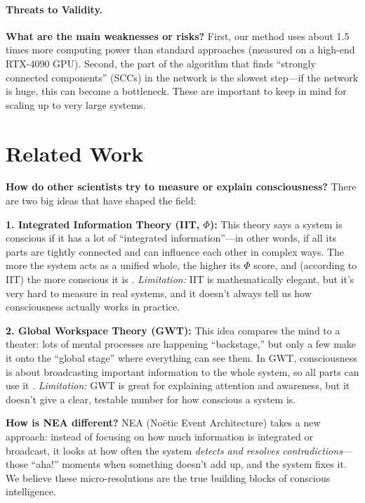\documentclass[11pt]{article}
\begin{document}
\paragraph{Threats to Validity.}
\textbf{What are the main weaknesses or risks?}  
First, our method uses about 1.5 times more computing power than standard approaches (measured on a high-end RTX-4090 GPU). Second, the part of the algorithm that finds “strongly connected components” (SCCs) in the network is the slowest step—if the network is huge, this can become a bottleneck. These are important to keep in mind for scaling up to very large systems.



\section{Related Work}
\label{sec:related}

\textbf{How do other scientists try to measure or explain consciousness?}  
There are two big ideas that have shaped the field:

\textbf{1. Integrated Information Theory (IIT, $\Phi$):}  
This theory says a system is conscious if it has a lot of “integrated information”—in other words, if all its parts are tightly connected and can influence each other in complex ways. The more the system acts as a unified whole, the higher its $\Phi$ score, and (according to IIT) the more conscious it is \cite{oizumi2014}.  
\emph{Limitation:} IIT is mathematically elegant, but it’s very hard to measure in real systems, and it doesn’t always tell us how consciousness actually works in practice.

\textbf{2. Global Workspace Theory (GWT):}  
This idea compares the mind to a theater: lots of mental processes are happening “backstage,” but only a few make it onto the “global stage” where everything can see them. In GWT, consciousness is about broadcasting important information to the whole system, so all parts can use it \cite{baars2005}.  
\emph{Limitation:} GWT is great for explaining attention and awareness, but it doesn’t give a clear, testable number for how conscious a system is.

\textbf{How is NEA different?}  
NEA (Noëtic Event Architecture) takes a new approach: instead of focusing on how much information is integrated or broadcast, it looks at how often the system \emph{detects and resolves contradictions}—those “aha!” moments when something doesn’t add up, and the system fixes it. We believe these micro-resolutions are the true building blocks of conscious intelligence.
\end{document}
